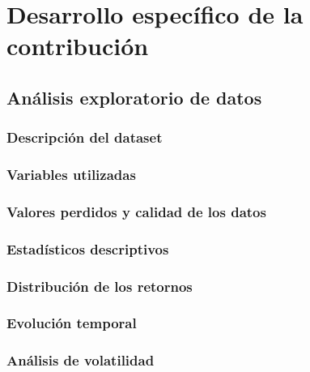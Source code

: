 \chapter{Desarrollo específico de la contribución}

\section{Análisis exploratorio de datos}

\subsection{Descripción del dataset}

\subsection{Variables utilizadas}

\subsection{Valores perdidos y calidad de los datos}

\subsection{Estadísticos descriptivos}

\subsection{Distribución de los retornos}

\subsection{Evolución temporal}

\subsection{Análisis de volatilidad}

